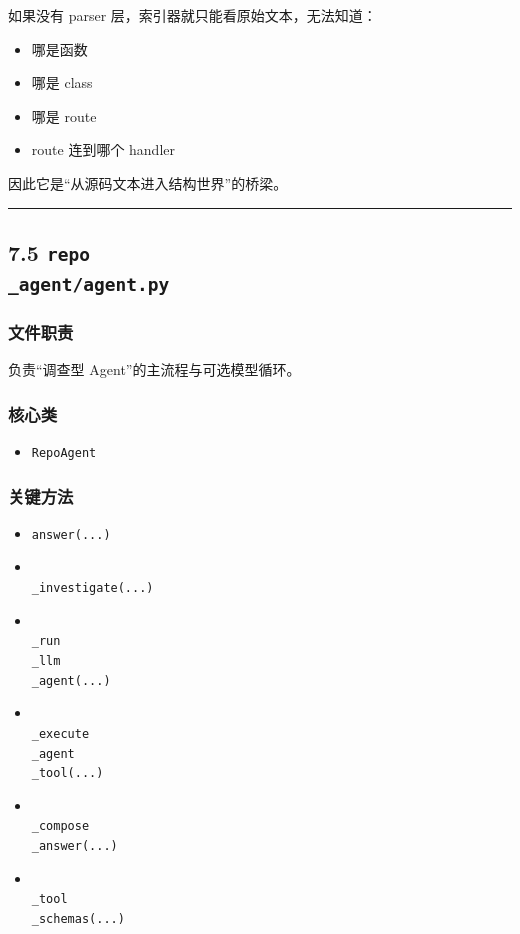 \documentclass[UTF8,12pt,openany]{ctexbook}
\begin{document}
如果没有 parser 层，索引器就只能看原始文本，无法知道：\par

\begin{itemize}
\item 哪是函数
\item 哪是 class
\item 哪是 route
\item route 连到哪个 handler
\end{itemize}

因此它是“从源码文本进入结构世界”的桥梁。\par

\hrule

\subsection{7.5 \texttt{repo\\_agent/agent.py}}

\subsubsection{文件职责}

负责“调查型 Agent”的主流程与可选模型循环。\par

\subsubsection{核心类}

\begin{itemize}
\item \texttt{RepoAgent}
\end{itemize}

\subsubsection{关键方法}

\begin{itemize}
\item \texttt{answer(...)}
\item \texttt{\\_investigate(...)}
\item \texttt{\\_run\\_llm\\_agent(...)}
\item \texttt{\\_execute\\_agent\\_tool(...)}
\item \texttt{\\_compose\\_answer(...)}
\item \texttt{\\_tool\\_schemas(...)}
\end{itemize}
\end{document}
